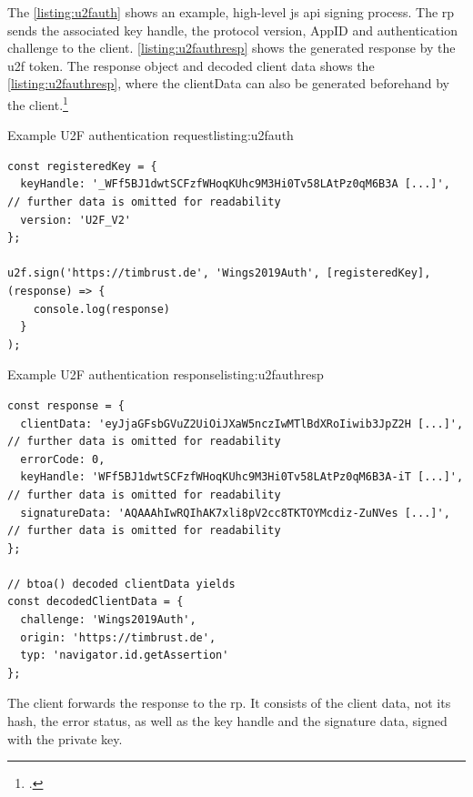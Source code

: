 The \autoref{listing:u2fauth} shows an example, high-level \gls{js} \gls{api} signing process. The \gls{rp} sends the associated key handle, the protocol version, AppID and authentication challenge to the client. \autoref{listing:u2fauthresp} shows the generated response by the \gls{u2f} token. The response object and decoded client data shows the \autoref{listing:u2fauthresp}, where the clientData can also be generated beforehand by the client.\footcites[See][3]{u2f-js-api}
\\
\begin{example}{Example U2F authentication request}{listing:u2fauth}
\begin{verbatim}
const registeredKey = {
  keyHandle: '_WFf5BJ1dwtSCFzfWHoqKUhc9M3Hi0Tv58LAtPz0qM6B3A [...]', // further data is omitted for readability
  version: 'U2F_V2'
};

u2f.sign('https://timbrust.de', 'Wings2019Auth', [registeredKey], (response) => {
    console.log(response)
  }
);
\end{verbatim}
\end{example}

\begin{example}{Example U2F authentication response}{listing:u2fauthresp}
\begin{verbatim}
const response = {
  clientData: 'eyJjaGFsbGVuZ2UiOiJXaW5nczIwMTlBdXRoIiwib3JpZ2H [...]', // further data is omitted for readability
  errorCode: 0,
  keyHandle: 'WFf5BJ1dwtSCFzfWHoqKUhc9M3Hi0Tv58LAtPz0qM6B3A-iT [...]', // further data is omitted for readability
  signatureData: 'AQAAAhIwRQIhAK7xli8pV2cc8TKTOYMcdiz-ZuNVes [...]', // further data is omitted for readability
};

// btoa() decoded clientData yields
const decodedClientData = {
  challenge: 'Wings2019Auth',
  origin: 'https://timbrust.de',
  typ: 'navigator.id.getAssertion'
};
\end{verbatim}
\end{example}

The client forwards the response to the \gls{rp}. It consists of the client data, not its hash, the error status, as well as the key handle and the signature data, signed with the private key.